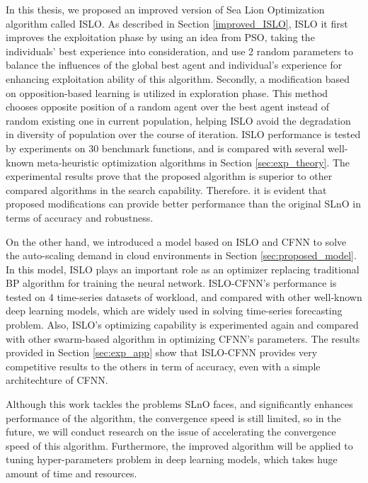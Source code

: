 \documentclass[../main.tex]{subfiles}
\begin{document}
In this thesis, we proposed an improved version of Sea Lion Optimization algorithm called ISLO. As described in Section \ref{improved_ISLO}, ISLO it first improves the exploitation phase by using an idea from PSO, taking the individuals' best experience into consideration, and use 2 random parameters to balance the influences of the global best agent and individual's experience for enhancing exploitation ability of this algorithm. Secondly, a modification based on opposition-based learning is utilized in exploration phase. This method chooses opposite position of a random agent over the best agent instead of random existing one in current population, helping ISLO avoid the degradation in diversity of population over the course of iteration. ISLO performance is tested by experiments on 30 benchmark functions, and is compared with several well-known meta-heuristic optimization algorithms in Section \ref{sec:exp_theory}. The experimental results prove that the proposed algorithm is superior to other compared algorithms in the search capability. Therefore. it is evident that proposed modifications can provide better performance than the original SLnO in terms of accuracy and robustness.

On the other hand, we introduced a model based on ISLO and CFNN to solve the auto-scaling demand in cloud environments in Section \ref{sec:proposed_model}. In this model, ISLO plays an important role as an optimizer replacing traditional BP algorithm for training the neural network. ISLO-CFNN's performance is tested on 4 time-series datasets of workload, and compared with other well-known deep learning models, which are widely used in solving time-series forecasting problem. Also, ISLO's optimizing capability is experimented again and compared with other swarm-based algorithm in optimizing CFNN's parameters. The results provided in Section \ref{sec:exp_app} show that ISLO-CFNN provides very competitive results to the others in term of accuracy, even with a simple architechture of CFNN. 

Although this work tackles the problems SLnO faces, and significantly enhances performance of the algorithm, the convergence speed is still limited, so in the future, we will conduct research on the issue of accelerating the convergence speed of this algorithm. Furthermore, the improved algorithm will be applied to tuning hyper-parameters problem in deep learning models, which takes huge amount of time and resources.
\end{document}
